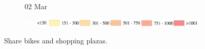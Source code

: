 \documentclass[ijgi,submit,moreauthors,pdftex]{Definitions/mdpi}
\begin{document}
\begin{figure}[H]
    \begin{subfigure}{.3\textwidth}
        \caption{02 Mar}
    \end{subfigure}

    \vspace{6pt}
    \begin{subfigure}{.7\textwidth}
        \includegraphics[width=\textwidth]{Figures/AppendixLegend2-eps-converted-to.pdf}
    \end{subfigure}
    \caption{Share bikes and shopping plazas.}
    \label{fig:BSS_malls}
\end{figure}
\end{document}

